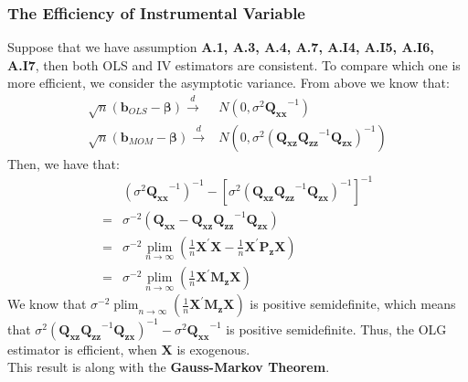 \documentclass{article}
\begin{document}
\subsubsection{The Efficiency of Instrumental Variable}
Suppose that we have assumption \textbf{A.1, A.3, A.4, A.7, A.I4, A.I5, A.I6, A.I7}, then both OLS and IV estimators are consistent. To compare which one is more efficient, we consider the asymptotic variance. From above we know that:
	\begin{align*}
		\sqrt{n}(\boldsymbol{b}_{OLS} - \boldsymbol{\beta}) \xrightarrow{d} & N(0, \sigma^2 \boldsymbol{Q_{xx}}^{-1})\\
		\sqrt{n}(\boldsymbol{b}_{MOM} - \boldsymbol{\beta}) \xrightarrow{d} & N(0, \sigma^2 (\boldsymbol{Q_{xz}} \boldsymbol{Q_{zz}}^{-1} \boldsymbol{Q_{zx}})^{-1})
	\end{align*}
Then, we have that:
	\begin{align*}
		&(\sigma^2 \boldsymbol{Q_{xx}}^{-1})^{-1} - [\sigma^2 (\boldsymbol{Q_{xz}} \boldsymbol{Q_{zz}}^{-1} \boldsymbol{Q_{zx}})^{-1}]^{-1}\\ = &
		\sigma^{-2} (\boldsymbol{Q_{xx}} - \boldsymbol{Q_{xz}} \boldsymbol{Q_{zz}}^{-1} \boldsymbol{Q_{zx}})\\ = &
		\sigma^{-2} \mathop{plim}\limits_{n\to\infty}(\frac{1}{n}\boldsymbol{X}^\prime\boldsymbol{X} - \frac{1}{n}\boldsymbol{X}^\prime\boldsymbol{P_z}\boldsymbol{X})\\ = &
		\sigma^{-2}\mathop{plim}\limits_{n\to\infty}(\frac{1}{n}\boldsymbol{X}^\prime\boldsymbol{M_z}\boldsymbol{X})
	\end{align*}
We know that $\sigma^{-2}\mathop{plim}_{n\to\infty}(\frac{1}{n}\boldsymbol{X}^\prime\boldsymbol{M_z}\boldsymbol{X})$ is positive semidefinite, which means that $\sigma^2 (\boldsymbol{Q_{xz}} \boldsymbol{Q_{zz}}^{-1} \boldsymbol{Q_{zx}})^{-1} - \sigma^2 \boldsymbol{Q_{xx}}^{-1}$ is positive semidefinite. Thus, the OLG estimator is efficient, when $\boldsymbol{X}$ is exogenous.\\
This result is along with the \textbf{Gauss-Markov Theorem}.
\end{document}
